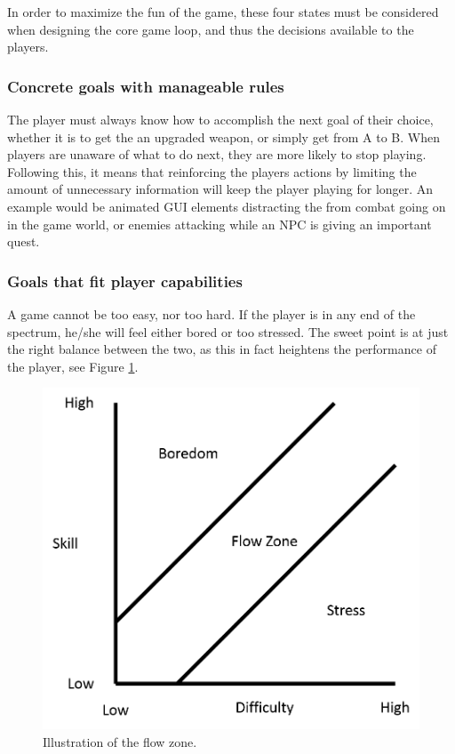 In order to maximize the fun of the game, these four states must be considered when designing the core game loop, and thus the decisions available to the players.

\subsubsection{Concrete goals with manageable rules}
The player must always know how to accomplish the next goal of their choice, whether it is to get the an upgraded weapon, or simply get from A to B.
When players are unaware of what to do next, they are more likely to stop playing.
Following this, it means that reinforcing the players actions by limiting the amount of unnecessary information will keep the player playing for longer.
An example would be animated GUI elements distracting the from combat going on in the game world, or enemies attacking while an NPC is giving an important quest.

\subsubsection{Goals that fit player capabilities}
A game cannot be too easy, nor too hard. 
If the player is in any end of the spectrum, he/she will feel either bored or too stressed.
The sweet point is at just the right balance between the two, as this in fact heightens the performance of the player, see Figure \ref{gamedesign:flowzone}.
\begin{figure}
    \includegraphics{figures/gamedesign/flowZone}
    \caption{Illustration of the flow zone.}
    \label{gamedesign:flowzone}
\end{figure}

